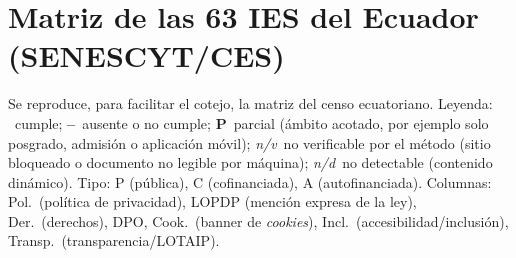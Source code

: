 \documentclass[11pt,a4paper]{article}
\newcommand{\si}{\ding{51}}
\newcommand{\no}{\textcolor{gris}{\textbf{--}}}
\newcommand{\nv}{\textsl{\footnotesize n/v}}
\newcommand{\nd}{\textsl{\footnotesize n/d}}
\begin{document}
\section{Matriz de las 63 IES del Ecuador (SENESCYT/CES)}
\label{ap:ecuador}
Se reproduce, para facilitar el cotejo, la matriz del censo ecuatoriano. Leyenda: \si~cumple; \no~ausente o no cumple; \textbf{P}~parcial (ámbito acotado, por ejemplo solo posgrado, admisión o aplicación móvil); \nv~no verificable por el método (sitio bloqueado o documento no legible por máquina); \nd~no detectable (contenido dinámico). Tipo: P (pública), C (cofinanciada), A (autofinanciada). Columnas: Pol.\ (política de privacidad), LOPDP (mención expresa de la ley), Der.\ (derechos), DPO, Cook.\ (banner de \emph{cookies}), Incl.\ (accesibilidad/inclusión), Transp.\ (transparencia/LOTAIP).
\end{document}
